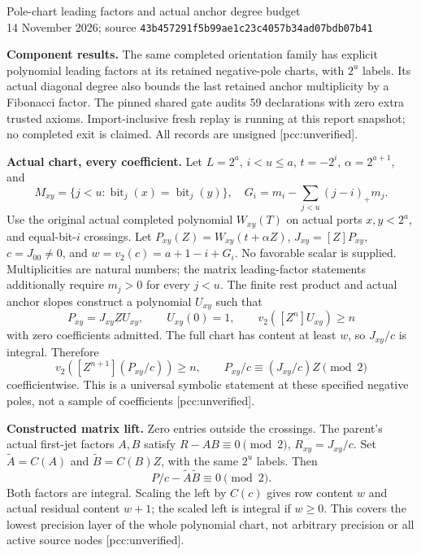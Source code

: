 \documentclass[10pt]{article}
\begin{document}
\begin{center}
{\Large Pole-chart leading factors and actual anchor degree budget}\\[4pt]
14 November 2026; source \texttt{43b457291f5b99ae1c23c4057b34ad07bdb07b41}
\end{center}
\textbf{Component results.} The same completed orientation family has
explicit polynomial leading factors at its retained negative-pole charts,
with $2^u$ labels. Its actual diagonal degree also bounds the last retained
anchor multiplicity by a Fibonacci factor. The pinned shared gate audits
59 declarations with zero extra trusted axioms. Import-inclusive fresh
replay is running at this report snapshot; no completed exit is claimed.
All records are unsigned [pcc:unverified].

\textbf{Actual chart, every coefficient.} Let $L=2^a$, $i<u\le a$,
$t=-2^i$, $\alpha=2^{a+1}$, and
\[
 M_{xy}=\{j<u:\operatorname{bit}_j(x)=\operatorname{bit}_j(y)\},\quad
 G_i=m_i-\sum_{j<u}(j-i)_+m_j.
\]
Use the original actual completed polynomial $W_{xy}(T)$ on actual ports
$x,y<2^a$, and equal-bit-$i$ crossings. Let $P_{xy}(Z)=W_{xy}(t+\alpha Z)$,
$J_{xy}=[Z]P_{xy}$, $c=J_{00}\ne0$, and
$w=v_2(c)=a+1-i+G_i$. No favorable scalar is supplied. Multiplicities are natural numbers; the
matrix leading-factor statements additionally require $m_j>0$ for every
$j<u$.
The finite rest product and actual anchor slopes construct a polynomial
$U_{xy}$ such that
\[
 P_{xy}=J_{xy}Z U_{xy},\qquad U_{xy}(0)=1,\qquad
 v_2([Z^n]U_{xy})\ge n
\]
with zero coefficients admitted. The full chart has content at least $w$,
so $J_{xy}/c$ is integral. Therefore
\[
 v_2([Z^{n+1}](P_{xy}/c))\ge n,\qquad
 P_{xy}/c\equiv (J_{xy}/c)Z\pmod 2
\]
coefficientwise. This is a universal symbolic statement at these specified
negative poles, not a sample of coefficients [pcc:unverified].

\textbf{Constructed matrix lift.} Zero entries outside the crossings.
The parent's actual first-jet factors $A,B$ satisfy $R-AB\equiv0\pmod2$,
$R_{xy}=J_{xy}/c$. Set $\widetilde A=C(A)$ and
$\widetilde B=C(B)Z$, with the same $2^u$ labels. Then
\[
 P/c-\widetilde A\widetilde B\equiv0\pmod2.
\]
Both factors are integral. Scaling the left by $C(c)$ gives row content
$w$ and actual residual content $w+1$; the scaled left is integral if
$w\ge0$. This covers the lowest precision layer of the whole polynomial
chart, not arbitrary precision or all active source nodes [pcc:unverified].
\end{document}
